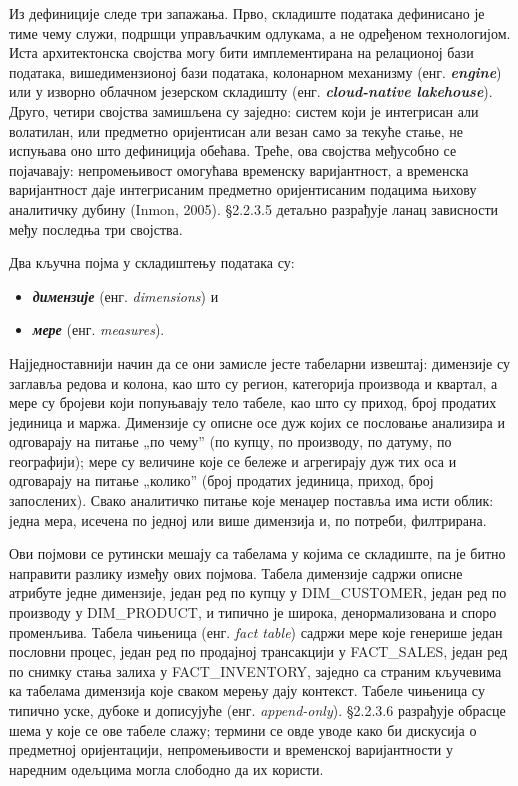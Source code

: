 Из дефиниције следе три запажања. Прво, складиште података дефинисано је тиме чему служи, подршци управљачким одлукама, а не одређеном технологијом. Иста архитектонска својства могу бити имплементирана на релационој бази података, вишедимензионој бази података, колонарном механизму (енг. \textbf{\textit{engine}}) или у изворно облачном језерском складишту (енг. \textbf{\textit{cloud-native lakehouse}}). Друго, четири својства замишљена су заједно: систем који је интегрисан али волатилан, или предметно оријентисан али везан само за текуће стање, не испуњава оно што дефиниција обећава. Треће, ова својства међусобно се појачавају: непромењивост омогућава временску варијантност, а временска варијантност даје интегрисаним предметно оријентисаним подацима њихову аналитичку дубину (Inmon, 2005). §2.2.3.5 детаљно разрађује ланац зависности међу последња три својства.

Два кључна појма у складиштењу података су: 

\begin{itemize}
  \item \textbf{\textit{димензије}} (енг. \textit{dimensions}) и
  \item \textbf{\textit{мере}} (енг. \textit{measures}).
\end{itemize}
Најједноставнији начин да се они замисле јесте табеларни извештај: димензије су заглавља редова и колона, као што су регион, категорија производа и квартал, а мере су бројеви који попуњавају тело табеле, као што су приход, број продатих јединица и маржа. Димензије су описне осе дуж којих се пословање анализира и одговарају на питање „по чему” (по купцу, по производу, по датуму, по географији); мере су величине које се бележе и агрегирају дуж тих оса и одговарају на питање „колико” (број продатих јединица, приход, број запослених). Свако аналитичко питање које менаџер поставља има исти облик: једна мера, исечена по једној или више димензија и, по потреби, филтрирана.

Ови појмови се рутински мешају са табелама у којима се складиште, па је битно направити разлику између ових појмова. Табела димензије садржи описне атрибуте једне димензије, један ред по купцу у DIM\_CUSTOMER, један ред по производу у DIM\_PRODUCT, и типично је широка, денормализована и споро променљива. Табела чињеница (енг. \textit{fact table}) садржи мере које генерише један пословни процес, један ред по продајној трансакцији у FACT\_SALES, један ред по снимку стања залиха у FACT\_INVENTORY, заједно са страним кључевима ка табелама димензија које сваком мерењу дају контекст. Табеле чињеница су типично уске, дубоке и дописујуће (енг. \textit{append-only}). §2.2.3.6 разрађује обрасце шема у које се ове табеле слажу; термини се овде уводе како би дискусија о предметној оријентацији, непромењивости и временској варијантности у наредним одељцима могла слободно да их користи.

